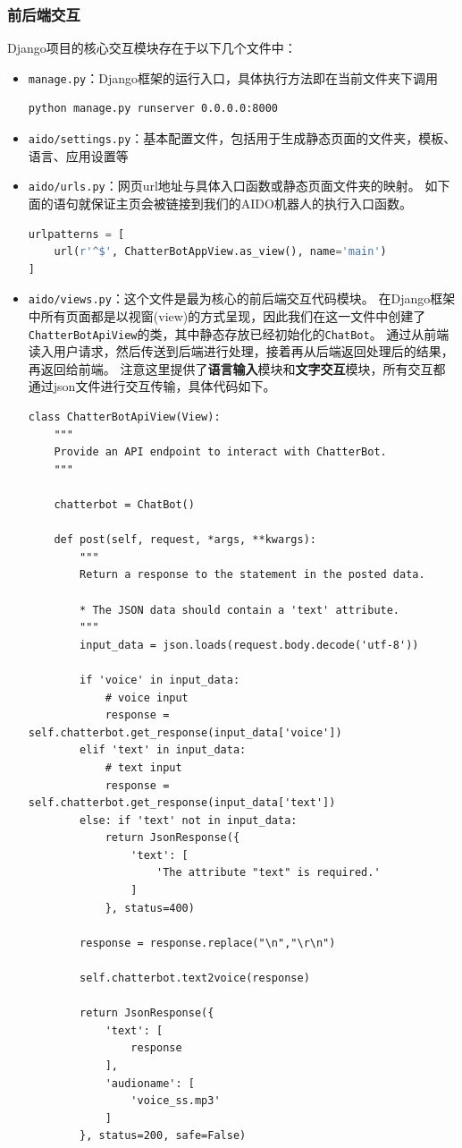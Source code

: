 \documentclass[logo,reportComp]{thesis}
\begin{document}
\subsubsection{前后端交互}
Django项目的核心交互模块存在于以下几个文件中：
\begin{itemize}
\item \verb'manage.py'：Django框架的运行入口，具体执行方法即在当前文件夹下调用
\begin{lstlisting}[language=bash]
python manage.py runserver 0.0.0.0:8000
\end{lstlisting}

\item \verb'aido/settings.py'：基本配置文件，包括用于生成静态页面的文件夹，模板、语言、应用设置等

\item \verb'aido/urls.py'：网页url地址与具体入口函数或静态页面文件夹的映射。
如下面的语句就保证主页会被链接到我们的AIDO机器人的执行入口函数。
\begin{lstlisting}[language=python]
urlpatterns = [
    url(r'^$', ChatterBotAppView.as_view(), name='main')
]
\end{lstlisting}

\item \verb'aido/views.py'：这个文件是最为核心的前后端交互代码模块。
在Django框架中所有页面都是以视窗(view)的方式呈现，因此我们在这一文件中创建了\verb'ChatterBotApiView'的类，其中静态存放已经初始化的\verb'ChatBot'。
通过从前端读入用户请求，然后传送到后端进行处理，接着再从后端返回处理后的结果，再返回给前端。
注意这里提供了\textbf{语言输入}模块和\textbf{文字交互}模块，所有交互都通过json文件进行交互传输，具体代码如下。
\begin{lstlisting}
class ChatterBotApiView(View):
    """
    Provide an API endpoint to interact with ChatterBot.
    """

    chatterbot = ChatBot()

    def post(self, request, *args, **kwargs):
        """
        Return a response to the statement in the posted data.

        * The JSON data should contain a 'text' attribute.
        """
        input_data = json.loads(request.body.decode('utf-8'))

        if 'voice' in input_data:
            # voice input
            response = self.chatterbot.get_response(input_data['voice'])
        elif 'text' in input_data:
            # text input
            response = self.chatterbot.get_response(input_data['text'])
        else: if 'text' not in input_data:
            return JsonResponse({
                'text': [
                    'The attribute "text" is required.'
                ]
            }, status=400)

        response = response.replace("\n","\r\n")

        self.chatterbot.text2voice(response)

        return JsonResponse({
            'text': [
                response
            ],
            'audioname': [
                'voice_ss.mp3'
            ]
        }, status=200, safe=False)
\end{lstlisting}
\end{itemize}
\end{document}
